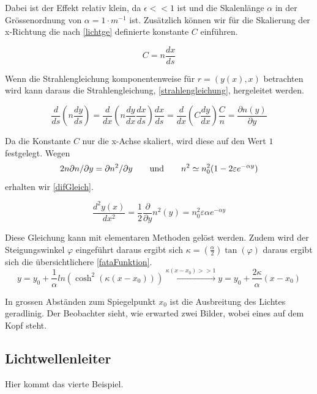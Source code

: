 Dabei ist der Effekt relativ klein, da $\epsilon << 1$ ist und 
die Skalenlänge $\alpha$ in der Grössenordnung von $\alpha = 1 \cdot m^{-1}$ ist.
Zusätzlich können wir für die Skalierung der x-Richtung die nach \eqref{lichtge} definierte konstante $C$ einführen.

\begin{equation}
	C = n \frac{dx}{ds}
	\label{lichtge}
\end{equation}

Wenn die Strahlengleichung komponentenweise für $r = (y(x), x)$ betrachten wird kann daraus die Strahlengleichung, \eqref{strahlengleichung}, hergeleitet werden.

\begin{equation}
\frac{d}{ds} \left ( n \frac{dy}{ds} \right ) = \frac{d}{dx} \left ( n \frac{dy}{dx} \frac{dx}{ds} \right ) \frac{dx}{ds} =
\frac{d}{dx} \left ( C \frac{dy}{dx} \right ) \frac{C}{n} = \frac{\partial n(y)}{\partial y}
\label{strahlengleichung}
\end{equation}

Da die Konstante $C$ nur die x-Achse skaliert, wird diese auf den Wert $1$ festgelegt.
Wegen 
\begin{equation}
	2 n \partial n / \partial y = \partial n^2 / \partial y \qquad \text{und} \qquad n^2 \simeq n_0^2(1 - 2 \varepsilon e^{-\alpha y}) \notag
\end{equation}erhalten wir \eqref{difGleich}.

\begin{equation}
	\frac{d^2 y(x)}{dx^2} = \frac{1}{2} \frac{\partial}{\partial y} n^2(y) = n_0^2 \varepsilon \alpha e^{-\alpha y}
	\label{difGleich}
\end{equation}

Diese Gleichung kann mit elementaren Methoden gelöst werden. 
Zudem wird der Steigungswinkel $\varphi$ eingeführt daraus ergibt sich
$\kappa = (\frac{\alpha}{2}) \tan(\varphi)$ daraus ergibt sich die übersichtlichere \eqref{fataFunktion}.
\begin{equation}
	y = y_0 + \frac{1}{\alpha} ln(\cosh^2(\kappa(x - x_0))) \xrightarrow{\kappa (x - x_0 ) >> 1} y =	y_0 + \frac{2 \kappa}{\alpha} (x - x_0)
	\label{fataFunktion}
\end{equation}


In grossen Abständen zum Spiegelpunkt $x_0$ ist die Ausbreitung des Lichtes geradlinig.
Der Beobachter sieht, wie erwarted zwei Bilder, wobei eines auf dem Kopf steht.

\subsection{Lichtwellenleiter}

Hier kommt das vierte Beispiel.